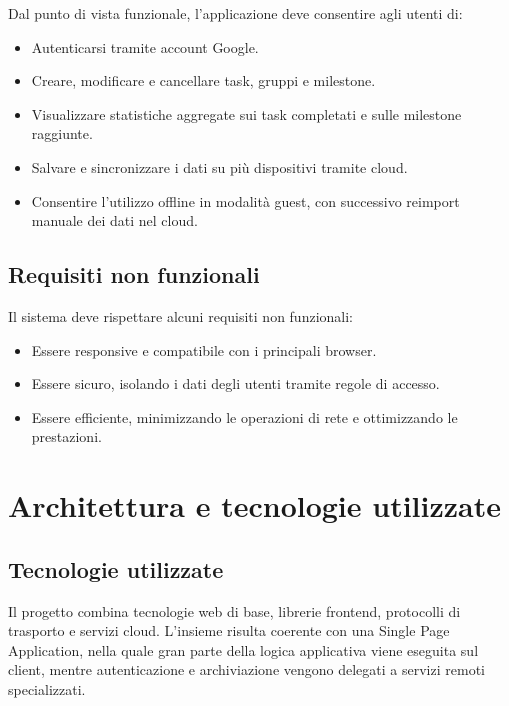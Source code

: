 \documentclass[11pt,a4paper]{article}
\begin{document}
\par Dal punto di vista funzionale, l'applicazione deve consentire agli utenti di:
\begin{itemize}
  \item Autenticarsi tramite account Google.
  \item Creare, modificare e cancellare task, gruppi e milestone.
  \item Visualizzare statistiche aggregate sui task completati e sulle milestone raggiunte.
  \item Salvare e sincronizzare i dati su più dispositivi tramite cloud.
  \item Consentire l'utilizzo offline in modalità guest, con successivo reimport manuale dei dati nel cloud.
\end{itemize}

\subsection{Requisiti non funzionali}

\par Il sistema deve rispettare alcuni requisiti non funzionali:
\begin{itemize}
  \item Essere responsive e compatibile con i principali browser.
  \item Essere sicuro, isolando i dati degli utenti tramite regole di accesso.
  \item Essere efficiente, minimizzando le operazioni di rete e ottimizzando le prestazioni.
\end{itemize}

\newpage
\section{Architettura e tecnologie utilizzate}

\subsection{Tecnologie utilizzate}

\par Il progetto combina tecnologie web di base, librerie frontend, protocolli di trasporto e servizi cloud. L'insieme risulta coerente con una Single Page Application, nella quale gran parte della logica applicativa viene eseguita sul client, mentre autenticazione e archiviazione vengono delegati a servizi remoti specializzati.
\end{document}
